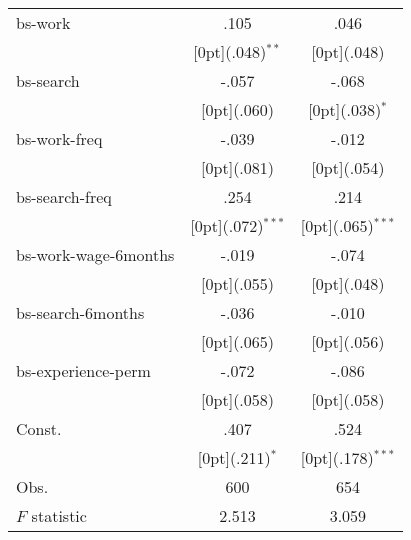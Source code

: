\documentclass{article}
\begin{document}
\begin{tabular*}{\textwidth}{@{\extracolsep{\fill}}lcc}
bs-work &	.105 &	.046 \\
&	\raisebox{.7ex}[0pt]{\scriptsize (.048)$^{**}$} &	\raisebox{.7ex}[0pt]{\scriptsize (.048)} \\
bs-search &	-.057 &	-.068 \\
&	\raisebox{.7ex}[0pt]{\scriptsize (.060)} &	\raisebox{.7ex}[0pt]{\scriptsize (.038)$^{*}$} \\
bs-work-freq &	-.039 &	-.012 \\
&	\raisebox{.7ex}[0pt]{\scriptsize (.081)} &	\raisebox{.7ex}[0pt]{\scriptsize (.054)} \\
bs-search-freq &	.254 &	.214 \\
&	\raisebox{.7ex}[0pt]{\scriptsize (.072)$^{***}$} &	\raisebox{.7ex}[0pt]{\scriptsize (.065)$^{***}$} \\
bs-work-wage-6months &	-.019 &	-.074 \\
&	\raisebox{.7ex}[0pt]{\scriptsize (.055)} &	\raisebox{.7ex}[0pt]{\scriptsize (.048)} \\
bs-search-6months &	-.036 &	-.010 \\
&	\raisebox{.7ex}[0pt]{\scriptsize (.065)} &	\raisebox{.7ex}[0pt]{\scriptsize (.056)} \\
bs-experience-perm &	-.072 &	-.086 \\
&	\raisebox{.7ex}[0pt]{\scriptsize (.058)} &	\raisebox{.7ex}[0pt]{\scriptsize (.058)} \\
Const. &	.407 &	.524 \\
&	\raisebox{.7ex}[0pt]{\scriptsize (.211)$^{*}$} &	\raisebox{.7ex}[0pt]{\scriptsize (.178)$^{***}$} \\
Obs. &	600 &	654 \\
$ F$ statistic &	2.513 &	3.059 \\
\hline\hline		
\end{tabular*}%
\end{document}
